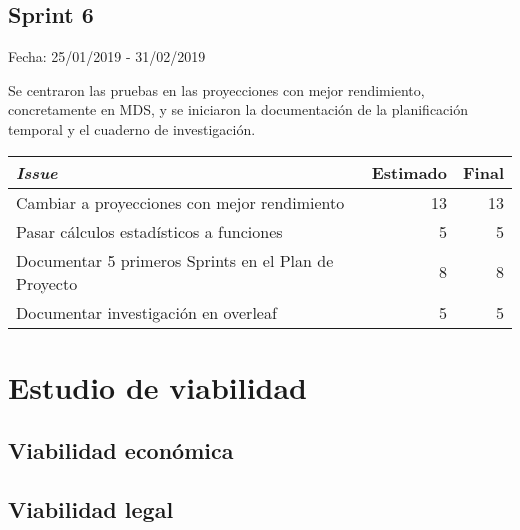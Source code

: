 \subsection{Sprint 6}

Fecha: 25/01/2019 - 31/02/2019

Se centraron las pruebas en las proyecciones con mejor rendimiento, concretamente en MDS, y se iniciaron la documentación de la planificación temporal y el cuaderno de investigación. 

\begin{table}[h]
	\begin{tabularx}{\textwidth}{|Xrr|}
		\hline \textbf{\textit{Issue}} & \textbf{Estimado} & \textbf{Final}\\
		\hline Cambiar a proyecciones con mejor rendimiento & 13 & 13 \\
		\hline Pasar cálculos estadísticos a funciones & 5 & 5 \\
		\hline Documentar 5 primeros Sprints en el Plan de Proyecto & 8 & 8 \\
		\hline Documentar investigación en overleaf & 5 & 5 \\
		\hline
	\end{tabularx}
\end{table}

\section{Estudio de viabilidad}

\subsection{Viabilidad económica}

\subsection{Viabilidad legal}


